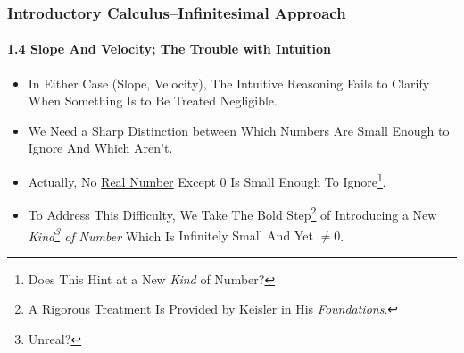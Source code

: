 \begin{frame}
\frametitle{Introductory Calculus--Infinitesimal Approach}
\framesubtitle{1.4 Slope And Velocity; The \alert{Trouble with Intuition}}
\label{slide:1.4-04}
\begin{itemize}
\item In Either Case (Slope, Velocity), The Intuitive Reasoning Fails to Clarify \alert{When Something Is to Be Treated Negligible}.
\pause\item We Need a \alert{Sharp Distinction} between \alert{Which Numbers Are Small Enough to Ignore And Which Aren't}.
\pause\item Actually, \alert{No \underline{Real Number} Except $0$ Is Small Enough To Ignore\footnote{Does This Hint at a New \textit{Kind} of Number?}}.
\pause\item To Address This Difficulty, We \alert{Take The Bold Step\footnote{A Rigorous Treatment Is Provided by Keisler in His \textit{Foundations}.} of Introducing a New \textit{Kind\footnote{Unreal?} of Number}} Which Is \alert{Infinitely Small And Yet $\ne 0$}.
\end{itemize}
\end{frame}
